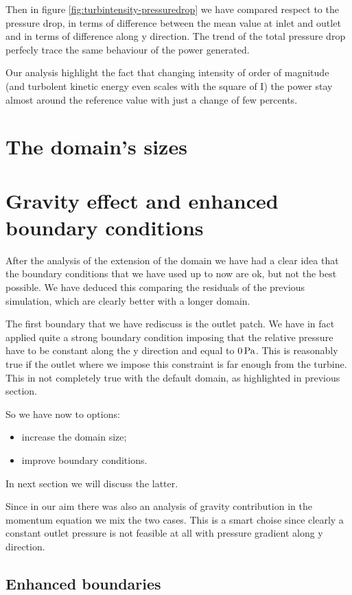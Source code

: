 \documentclass[a4paper,12pt]{article}
\begin{document}
Then in figure \ref{fig:turbintensity-pressuredrop} we have compared respect to the pressure drop, in terms of difference between the mean value at inlet and outlet and in terms of difference along y direction.
The trend of the total pressure drop perfecly trace the same behaviour of the power generated.

Our analysis highlight the fact that changing intensity of order of magnitude (and turbolent kinetic energy even scales with the square of I) the power stay almost around the reference value with just a change of few percents.

\section{The domain's sizes}


\section{Gravity effect and enhanced boundary conditions}

After the analysis of the extension of the domain we have had a clear idea that the boundary conditions that we have used up to now are ok, 
but not the best possible. We have deduced this comparing the residuals of the previous simulation, which are clearly better with a longer domain. 

The first boundary that we have rediscuss is the outlet patch. We have in fact applied quite a strong boundary condition imposing that the relative pressure have to be constant along the y direction and equal to $0\,\text{Pa}$. This is reasonably true if the outlet where we impose this constraint is far enough from the turbine. This in not completely true with the default domain, as highlighted in previous section.

So we have now to options:
\begin{itemize}
\item increase the domain size;
\item improve boundary conditions.
\end{itemize}  
In next section we will discuss the latter.

Since in our aim there was also an analysis of gravity contribution in the momentum equation we mix the two cases.
This is a smart choise since clearly a constant outlet pressure is not feasible at all with pressure gradient along y direction.

\subsection{Enhanced boundaries}
\end{document}
